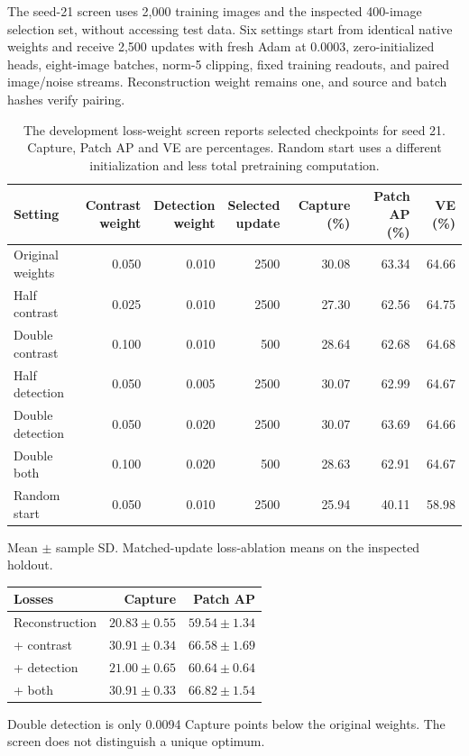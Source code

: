 The seed-21 screen uses 2,000 training images and the inspected 400-image
selection set, without accessing test data. Six settings start from identical
native weights and receive 2,500 updates with fresh Adam at 0.0003,
zero-initialized heads, eight-image batches, norm-5 clipping, fixed training
readouts, and paired image/noise streams. Reconstruction weight remains one,
and source and batch hashes verify pairing.
\begin{table}[t]
\centering
\small
\setlength{\tabcolsep}{3pt}
\renewcommand{\arraystretch}{1.05}
\caption{The development loss-weight screen reports selected checkpoints for seed 21. Capture, Patch AP and VE are percentages. Random start uses a different initialization and less total pretraining computation.}
\label{tab:sweep}\label{tab:sweep-selected}\label{fig:sweep}
\begin{tabular}{@{}lrrrrrr@{}}
\toprule
Setting & \shortstack{Contrast\\weight} & \shortstack{Detection\\weight} & \shortstack{Selected\\update} & Capture (\%) & Patch AP (\%) & VE (\%) \\
\midrule
Original weights & 0.050 & 0.010 & 2500 & 30.08 & 63.34 & 64.66 \\
Half contrast & 0.025 & 0.010 & 2500 & 27.30 & 62.56 & 64.75 \\
Double contrast & 0.100 & 0.010 & 500 & 28.64 & 62.68 & 64.68 \\
Half detection & 0.050 & 0.005 & 2500 & 30.07 & 62.99 & 64.67 \\
Double detection & 0.050 & 0.020 & 2500 & 30.07 & 63.69 & 64.66 \\
Double both & 0.100 & 0.020 & 500 & 28.63 & 62.91 & 64.67 \\
Random start & 0.050 & 0.010 & 2500 & 25.94 & 40.11 & 58.98 \\
\bottomrule
\end{tabular}

\end{table}
\begin{agfresulttable}
\caption{Mean $\pm$ sample SD. Matched-update loss-ablation means on the inspected holdout.}\label{tab:loss-means}
\begin{tabular}{@{}lrr@{}}\toprule
Losses & Capture & Patch AP\\\midrule
Reconstruction & $20.83\pm0.55$ & $59.54\pm1.34$\\
+ contrast & $30.91\pm0.34$ & $66.58\pm1.69$\\
+ detection & $21.00\pm0.65$ & $60.64\pm0.64$\\
+ both & $30.91\pm0.33$ & $66.82\pm1.54$\\
\bottomrule\end{tabular}

\end{agfresulttable}
Double detection is only 0.0094 Capture points below the original weights.
The screen does not distinguish a unique optimum.

